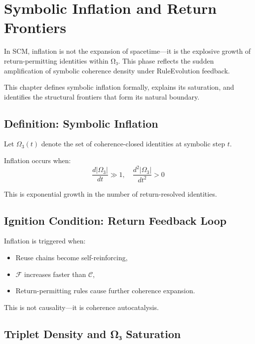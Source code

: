 \chapter{Symbolic Inflation and Return Frontiers} \label{chapter-inflation}

In SCM, inflation is not the expansion of spacetime—it is the explosive growth of return-permitting identities within Ω₃. This phase reflects the sudden amplification of symbolic coherence density under RuleEvolution feedback.

This chapter defines symbolic inflation formally, explains its saturation, and identifies the structural frontiers that form its natural boundary.

\section{Definition: Symbolic Inflation} \label{sec:def-inflation}

Let $\Omega_3(t)$ denote the set of coherence-closed identities at symbolic step $t$.

\begin{definition}
Inflation occurs when:
\[
\frac{d|\Omega_3|}{dt} \gg 1,\quad \frac{d^2|\Omega_3|}{dt^2} > 0
\]
\end{definition}

This is exponential growth in the number of return-resolved identities.

\section{Ignition Condition: Return Feedback Loop} \label{sec:feedback-loop}

Inflation is triggered when:
\begin{itemize}
  \item Reuse chains become self-reinforcing,
  \item $\mathcal{F}$ increases faster than $\mathcal{C}$,
  \item Return-permitting rules cause further coherence expansion.
\end{itemize}

This is not causality—it is coherence autocatalysis.

\section{Triplet Density and Ω₃ Saturation} \label{sec:triplet-density}

